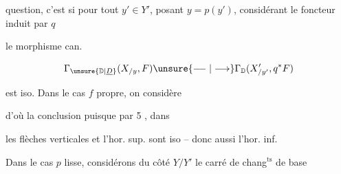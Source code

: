 
 question, c'est si pour tout $y'\in Y'$, posant $y=p(y')$,  considérant le foncteur induit par $q$


le morphisme can.

\[
\Gamma_{\unsure{\mathbb D|\underline D}}(X_{/y},F)\unsure{\relbar\joinrel\relbar|\longrightarrow}\Gamma_{\mathbb D}(X'_{/y'},q^*F)
\]

est iso. Dans le cas $f$ propre, on considère


d'où la conclusion puisque par  5 , dans


les flèches verticales et l'hor. sup. sont iso -- donc aussi l'hor. inf. 

Dans le cas $p$ lisse, considérons du côté $Y/Y'$ le carré de chang$^{\mathrm{ts}}$ de base

